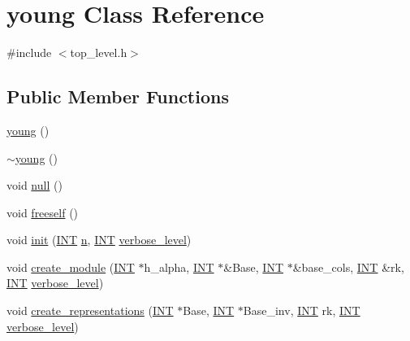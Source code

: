 \hypertarget{classyoung}{}\section{young Class Reference}
\label{classyoung}


{\ttfamily \#include $<$top\+\_\+level.\+h$>$}

\subsection*{Public Member Functions}
\begin{DoxyCompactItemize}
\item 
\mbox{\hyperlink{classyoung_a994102e0a50afbc1bad4ef51c05227ac}{young}} ()
\item 
\mbox{\hyperlink{classyoung_ac8719499d429636a48c3728ddc1a26b0}{$\sim$young}} ()
\item 
void \mbox{\hyperlink{classyoung_a360e64c0c83802065ccc38dd7e5a54e1}{null}} ()
\item 
void \mbox{\hyperlink{classyoung_a5476a4dd5d5ac9c54065b5144f134e32}{freeself}} ()
\item 
void \mbox{\hyperlink{classyoung_abbcd21425b16be0635f5ede77c0cdc28}{init}} (\mbox{\hyperlink{galois_8h_a09fddde158a3a20bd2dcadb609de11dc}{I\+NT}} \mbox{\hyperlink{classyoung_a5a4ed3dd37f08aa25476be7f065966c4}{n}}, \mbox{\hyperlink{galois_8h_a09fddde158a3a20bd2dcadb609de11dc}{I\+NT}} \mbox{\hyperlink{simeon_8_c_a818073fbcc2f439e7c56952f67386122}{verbose\+\_\+level}})
\item 
void \mbox{\hyperlink{classyoung_a552fe75292286e49ee0d3f282ea03f8e}{create\+\_\+module}} (\mbox{\hyperlink{galois_8h_a09fddde158a3a20bd2dcadb609de11dc}{I\+NT}} $\ast$h\+\_\+alpha, \mbox{\hyperlink{galois_8h_a09fddde158a3a20bd2dcadb609de11dc}{I\+NT}} $\ast$\&Base, \mbox{\hyperlink{galois_8h_a09fddde158a3a20bd2dcadb609de11dc}{I\+NT}} $\ast$\&base\+\_\+cols, \mbox{\hyperlink{galois_8h_a09fddde158a3a20bd2dcadb609de11dc}{I\+NT}} \&rk, \mbox{\hyperlink{galois_8h_a09fddde158a3a20bd2dcadb609de11dc}{I\+NT}} \mbox{\hyperlink{simeon_8_c_a818073fbcc2f439e7c56952f67386122}{verbose\+\_\+level}})
\item 
void \mbox{\hyperlink{classyoung_ac8179e6c679636e61f6effd72e392a15}{create\+\_\+representations}} (\mbox{\hyperlink{galois_8h_a09fddde158a3a20bd2dcadb609de11dc}{I\+NT}} $\ast$Base, \mbox{\hyperlink{galois_8h_a09fddde158a3a20bd2dcadb609de11dc}{I\+NT}} $\ast$Base\+\_\+inv, \mbox{\hyperlink{galois_8h_a09fddde158a3a20bd2dcadb609de11dc}{I\+NT}} rk, \mbox{\hyperlink{galois_8h_a09fddde158a3a20bd2dcadb609de11dc}{I\+NT}} \mbox{\hyperlink{simeon_8_c_a818073fbcc2f439e7c56952f67386122}{verbose\+\_\+level}})

\end{DoxyCompactItemize}
